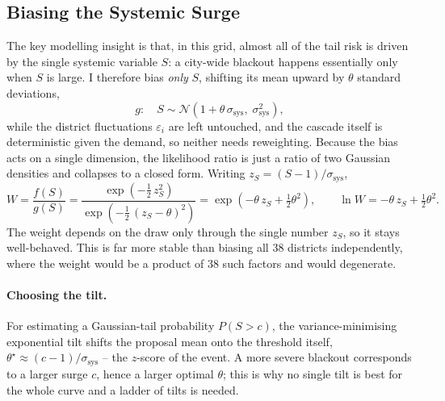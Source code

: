 \documentclass[11pt,a4paper]{article}
\begin{document}
\subsection{Biasing the Systemic Surge}

The key modelling insight is that, in this grid, almost all of the tail risk is
driven by the single systemic variable $S$: a city-wide blackout happens
essentially only when $S$ is large. I therefore bias \emph{only} $S$, shifting
its mean upward by $\theta$ standard deviations,
\begin{equation}
    g:\quad S \sim \mathcal{N}\!\left(1 + \theta\,\sigma_{\text{sys}},\; \sigma_{\text{sys}}^2\right),
\end{equation}
while the district fluctuations $\varepsilon_i$ are left untouched, and the cascade
itself is deterministic given the demand, so neither needs reweighting. Because the
bias acts on a single dimension, the likelihood ratio is just a ratio of two
Gaussian densities and collapses to a closed form. Writing
$z_S = (S-1)/\sigma_{\text{sys}}$,
\begin{equation}
    W = \frac{f(S)}{g(S)}
      = \frac{\exp\!\left(-\tfrac{1}{2}\,z_S^{2}\right)}
             {\exp\!\left(-\tfrac{1}{2}\,(z_S-\theta)^{2}\right)}
      = \exp\!\left(-\theta\,z_S + \tfrac{1}{2}\theta^{2}\right),
    \qquad \ln W = -\theta\,z_S + \tfrac{1}{2}\theta^{2}.
\end{equation}
The weight depends on the draw only through the single number $z_S$, so it stays
well-behaved. This is far more stable than biasing all 38 districts independently,
where the weight would be a product of 38 such factors and would degenerate.

\paragraph{Choosing the tilt.} For estimating a Gaussian-tail probability
$P(S > c)$, the variance-minimising exponential tilt shifts the proposal mean onto
the threshold itself, $\theta^{\star} \approx (c-1)/\sigma_{\text{sys}}$ -- the
$z$-score of the event. A more severe blackout corresponds to a larger surge $c$,
hence a larger optimal $\theta$; this is why no single tilt is best for the whole
curve and a ladder of tilts is needed.
\end{document}
